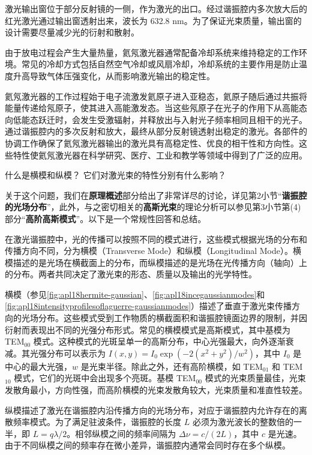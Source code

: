 激光输出窗位于部分反射镜的一侧，作为激光的出口。经过谐振腔内多次放大后的红光激光通过输出窗透射出来，波长为 632.8 nm。为了保证光束质量，输出窗的设计需要尽量减少光的衍射和散射。

由于放电过程会产生大量热量，氦氖激光器通常配备冷却系统来维持稳定的工作环境。常见的冷却方式包括自然空气冷却或风扇冷却，冷却系统的主要作用是防止温度升高导致气体压强变化，从而影响激光输出的稳定性。

氦氖激光器的工作过程始于电子流激发氦原子进入亚稳态，氦原子随后通过共振将能量传递给氖原子，使其进入高能激发态。当这些氖原子在光子的作用下从高能态向低能态跃迁时，会发生受激辐射，并释放出与入射光子频率相同且相干的光子。通过谐振腔内的多次反射和放大，最终从部分反射镜透射出稳定的激光。各部件的协调工作确保了氦氖激光器输出的激光具有高稳定性、优良的相干性和方向性。这些特性使氦氖激光器在科学研究、医疗、工业和教学等领域中得到了广泛的应用。

\begin{question}
	什么是横模和纵模？
	它们对激光束的特性分别有什么影响？
\end{question}
关于这个问题，我们在\textbf{原理概述}部分给出了非常详尽的讨论，详见第2小节“\textbf{谐振腔的光场分布}”，此外，与之密切相关的\textbf{高斯光束}的理论分析可以参见第3小节第(4)部分“\textbf{高阶高斯模式}”。以下是一个常规性回答和总结。

在激光谐振腔中，光的传播可以按照不同的模式进行，这些模式根据光场的分布和传播方向不同，分为横模（Transverse Mode）和纵模（Longitudinal Mode）。横模描述的是光场在横截面上的分布，而纵模描述的是光场在光传播方向（轴向）上的分布。两者共同决定了激光束的形态、质量以及输出的光学特性。

横模（参见\cref{fig:apl18hermite-gaussian}、\cref{fig:apl18incegaussianmodes}和\cref{fig:apl18intensityprofilesoflaguerre-gaussianmodes}）描述了垂直于激光束传播方向的光场分布。这些模式受到工作物质的横截面积和谐振腔镜面边界的限制，并因衍射而表现出不同的光强分布形式。常见的横模模式是高斯模式，其中基模为 TEM\(_{00}\) 模式。这种模式的光斑呈单一的高斯分布，中心光强最大，向外逐渐衰减。其光强分布可以表示为 \(I(x, y) = I_0 \exp(-2(x^2 + y^2)/w^2)\)，其中 \(I_0\) 是中心的最大光强，\(w\) 是光束半径。除此之外，还有高阶横模，如 TEM\(_{01}\) 和 TEM\(_{10}\) 模式，它们的光斑中会出现多个亮斑。基模 TEM\(_{00}\) 模式的光束质量最佳，光束发散角最小，方向性强，而高阶横模的光束发散角较大，光束质量和准直性较差。

纵模描述了激光在谐振腔内沿传播方向的光场分布，对应于谐振腔内允许存在的离散频率模式。为了满足驻波条件，谐振腔的长度 \(L\) 必须为激光波长的整数倍的一半，即 \(L = q \lambda / 2\)。相邻纵模之间的频率间隔为 \(\Delta \nu = c / (2L)\)，其中 \(c\) 是光速。由于不同纵模之间的频率存在微小差异，谐振腔内通常会同时存在多个纵模。

